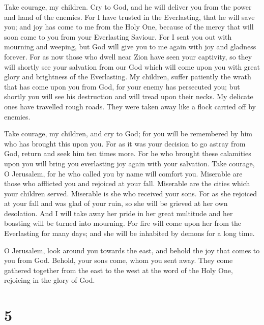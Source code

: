  Take courage, my children. Cry to God, and he will deliver
you from the power and hand of the enemies.  For I have
trusted in the Everlasting, that he will save you; and joy has come to
me from the Holy One, because of the mercy that will soon come to you
from your Everlasting Saviour.  For I sent you out with
mourning and weeping, but God will give you to me again with joy and
gladness forever.  For as now those who dwell near Zion
have seen your captivity, so they will shortly see your salvation from
our God which will come upon you with great glory and brightness of the
Everlasting.  My children, suffer patiently the wrath that
has come upon you from God, for your enemy has persecuted you; but
shortly you will see his destruction and will tread upon their necks.
 My delicate ones have travelled rough roads. They were
taken away like a flock carried off by enemies.

 Take courage, my children, and cry to God; for you will be
remembered by him who has brought this upon you.  For as it
was your decision to go astray from God, return and seek him ten times
more.  For he who brought these calamities upon you will
bring you everlasting joy again with your salvation.  Take
courage, O Jerusalem, for he who called you by name will comfort you.
 Miserable are those who afflicted you and rejoiced at your
fall.  Miserable are the cities which your children served.
Miserable is she who received your sons.  For as she
rejoiced at your fall and was glad of your ruin, so she will be grieved
at her own desolation.  And I will take away her pride in
her great multitude and her boasting will be turned into mourning.
 For fire will come upon her from the Everlasting for many
days; and she will be inhabited by demons for a long time.

 O Jerusalem, look around you towards the east, and behold
the joy that comes to you from God.  Behold, your sons
come, whom you sent away. They come gathered together from the east to
the west at the word of the Holy One, rejoicing in the glory of God.

\hypertarget{section-4}{%
\section{5}\label{section-4}}

